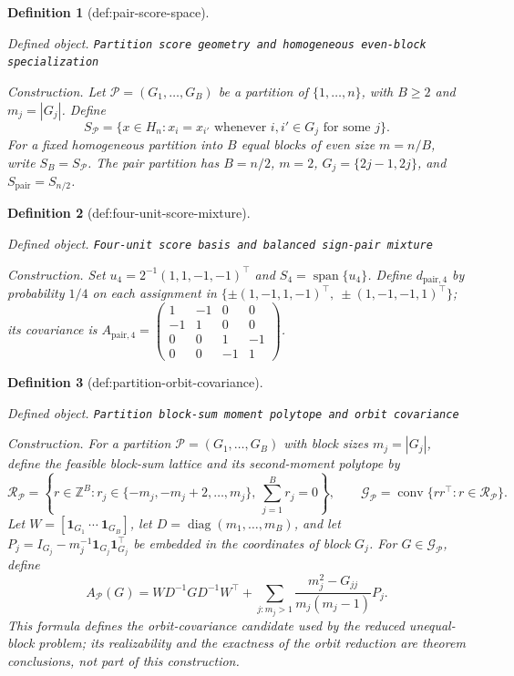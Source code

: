 \documentclass{article}
\newtheorem{definition}{Definition}
\begin{document}
\begin{definition}[def:pair-score-space]\label{def:pair-score-space}
\par\smallskip\noindent\emph{Defined object.} \texttt{Partition score geometry and homogeneous even-\allowbreak{}block specialization}
\par\smallskip\noindent\emph{Construction.} Let \(\mathcal P=(G_1,\ldots,G_B)\) be a partition of \(\{1,\ldots,n\}\), with \(B\geq2\) and \(m_j=|G_j|\). Define
\[
S_{\mathcal P}=\{x\in H_n:x_i=x_{i'}\text{ whenever }i,i'\in G_j\text{ for some }j\}.
\]
For a fixed homogeneous partition into \(B\) equal blocks of even size \(m=n/B\), write \(S_B=S_{\mathcal P}\). The pair partition has \(B=n/2\), \(m=2\), \(G_j=\{2j-1,2j\}\), and \(S_{\mathrm{pair}}=S_{n/2}\).
\end{definition}

\begin{definition}[def:four-unit-score-mixture]\label{def:four-unit-score-mixture}
\par\smallskip\noindent\emph{Defined object.} \texttt{Four-\allowbreak{}unit score basis and balanced sign-\allowbreak{}pair mixture}
\par\smallskip\noindent\emph{Construction.} Set \(u_4=2^{-1}(1,1,-1,-1)^\top\) and \(S_4=\operatorname{span}\{u_4\}\). Define \(d_{\mathrm{pair},4}\) by probability \(1/4\) on each assignment in \(\{\pm(1,-1,1,-1)^\top,\ \pm(1,-1,-1,1)^\top\}\); its covariance is \(A_{\mathrm{pair},4}=\begin{pmatrix}1&-1&0&0\\-1&1&0&0\\0&0&1&-1\\0&0&-1&1\end{pmatrix}\).
\end{definition}

\begin{definition}[def:partition-orbit-covariance]\label{def:partition-orbit-covariance}
\par\smallskip\noindent\emph{Defined object.} \texttt{Partition block-\allowbreak{}sum moment polytope and orbit covariance}
\par\smallskip\noindent\emph{Construction.} For a partition \(\mathcal P=(G_1,\ldots,G_B)\) with block sizes \(m_j=|G_j|\), define the feasible block-sum lattice and its second-moment polytope by
\[
\mathcal R_{\mathcal P}
=\left\{r\in\mathbb Z^B:r_j\in\{-m_j,-m_j+2,\ldots,m_j\},\ \sum_{j=1}^B r_j=0\right\},
\qquad
\mathcal G_{\mathcal P}=\operatorname{conv}\{rr^\top:r\in\mathcal R_{\mathcal P}\}.
\]
Let \(W=[\mathbf 1_{G_1}\ \cdots\ \mathbf 1_{G_B}]\), let \(D=\operatorname{diag}(m_1,\ldots,m_B)\), and let \(P_j=I_{G_j}-m_j^{-1}\mathbf 1_{G_j}\mathbf 1_{G_j}^\top\) be embedded in the coordinates of block \(G_j\). For \(G\in\mathcal G_{\mathcal P}\), define
\[
A_{\mathcal P}(G)
=WD^{-1}GD^{-1}W^\top
+\sum_{j:m_j>1}\frac{m_j^2-G_{jj}}{m_j(m_j-1)}P_j.
\]
This formula defines the orbit-covariance candidate used by the reduced unequal-block problem; its realizability and the exactness of the orbit reduction are theorem conclusions, not part of this construction.
\end{definition}
\end{document}
